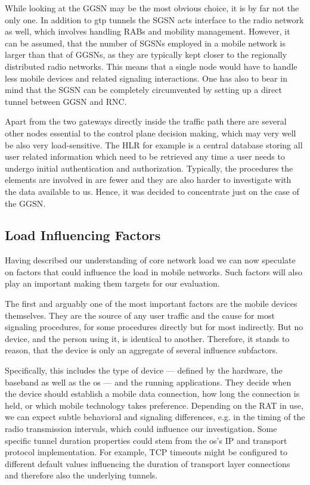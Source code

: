 While looking at the \gls{GGSN} may be the most obvious choice, it is by far not the only one. In addition to \gls{gtp} tunnels the \gls{SGSN} acts interface to the radio network as well, which involves handling \glspl{RAB} and mobility management. However, it can be assumed, that the number of \glspl{SGSN} employed in a mobile network is larger than that of \glspl{GGSN}, as they are typically kept closer to the regionally distributed radio networks. This means that a single node would have to handle less mobile devices and related signaling interactions. One has also to bear in mind that the \gls{SGSN} can be completely circumvented by setting up a direct tunnel between \gls{GGSN} and \gls{RNC}.

Apart from the two gateways directly inside the traffic path there are several other nodes essential to the control plane decision making, which may very well be also very load-sensitive. The \gls{HLR} for example is a central database storing all user related information which need to be retrieved any time a user needs to undergo initial authentication and authorization. Typically, the procedures the elements are involved in are fewer and they are also harder to investigate with the data available to us. Hence, it was decided to concentrate just on the case of the \gls{GGSN}.



\subsection{Load Influencing Factors}

Having described our understanding of core network load we can now speculate on factors that could influence the load in mobile networks. Such factors will also play an important  making them targets for our evaluation.

The first and arguably one of the most important factors are the mobile devices themselves. They are the source of any user traffic and the cause for most signaling procedures, for some procedures directly but for most indirectly. But no device, and the person using it, is identical to another. Therefore, it stands to reason, that the device is only an aggregate of several influence subfactors.

Specifically, this includes the type of device --- defined by the hardware, the baseband as well as the \gls{os} --- and the running applications. They decide when the device should establish a mobile data connection, how long the connection is held, or which mobile technology takes preference. Depending on the \gls{RAT} in use, we can expect subtle behavioral and signaling differences, e.g. in the timing of the radio transmission intervals, which could influence our investigation. Some specific tunnel duration properties could stem from the \gls{os}'s \gls{IP} and transport protocol implementation. For example, \gls{TCP} timeouts might be configured to different default values influencing the duration of transport layer connections and therefore also the underlying tunnels.

